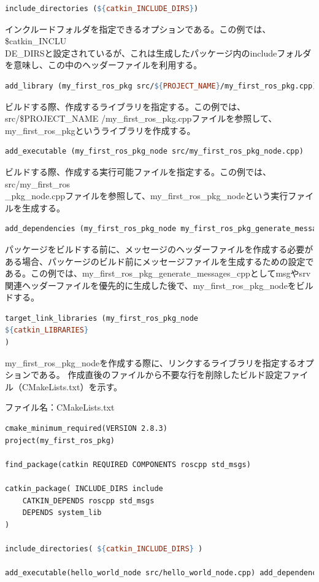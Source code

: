 \begin{lstlisting}[language=make]
include_directories (${catkin_INCLUDE_DIRS})
\end{lstlisting}

インクルードフォルダを指定できるオプションである。この例では、\${catkin\_INCLU\\DE\_DIRS}と設定されているが、これは生成したパッケージ内のincludeフォルダを意味し、この中のヘッダーファイルを利用する。

\begin{lstlisting}[language=make]
add_library (my_first_ros_pkg src/${PROJECT_NAME}/my_first_ros_pkg.cpp)
\end{lstlisting}

ビルドする際、作成するライブラリを指定する。この例では、src/\${PROJECT\_NAME} /my\_first\_ros\_pkg.cppファイルを参照して、my\_first\_ros\_pkgというライブラリを作成する。

\begin{lstlisting}[language=make]
add_executable (my_first_ros_pkg_node src/my_first_ros_pkg_node.cpp)
\end{lstlisting}

ビルドする際、作成する実行可能ファイルを指定する。この例では、src/my\_first\_ros\\\_pkg\_node.cppファイルを参照して、my\_first\_ros\_pkg\_nodeという実行ファイルを生成する。

\begin{lstlisting}[language=make]
add_dependencies (my_first_ros_pkg_node my_first_ros_pkg_generate_messages_cpp)
\end{lstlisting}

パッケージをビルドする前に、メッセージのヘッダーファイルを作成する必要がある場合、パッケージのビルド前にメッセージファイルを生成するための設定である。この例では、my\_first\_ros\_pkg\_generate\_messages\_cppとしてmsgやsrv関連ヘッダーファイルを優先的に生成した後で、my\_first\_ros\_pkg\_nodeをビルドする。

\begin{lstlisting}[language=make]
target_link_libraries (my_first_ros_pkg_node
${catkin_LIBRARIES}
)
\end{lstlisting}

my\_first\_ros\_pkg\_nodeを作成する際に、リンクするライブラリを指定するオプションである。
作成直後のファイルから不要な行を削除したビルド設定ファイル（CMakeLists.txt）を示す。

ファイル名：CMakeLists.txt
\begin{lstlisting}[language=make]
cmake_minimum_required(VERSION 2.8.3)
project(my_first_ros_pkg)

find_package(catkin REQUIRED COMPONENTS roscpp std_msgs)

catkin_package( INCLUDE_DIRS include
    CATKIN_DEPENDS roscpp std_msgs
    DEPENDS system_lib
)

include_directories( ${catkin_INCLUDE_DIRS} )

add_executable(hello_world_node src/hello_world_node.cpp) add_dependencies(hello_world_node my_first_ros_pkg_generate_messages_cpp) target_link_libraries(hello_world_node ${catkin_LIBRARIES})
\end{lstlisting}


